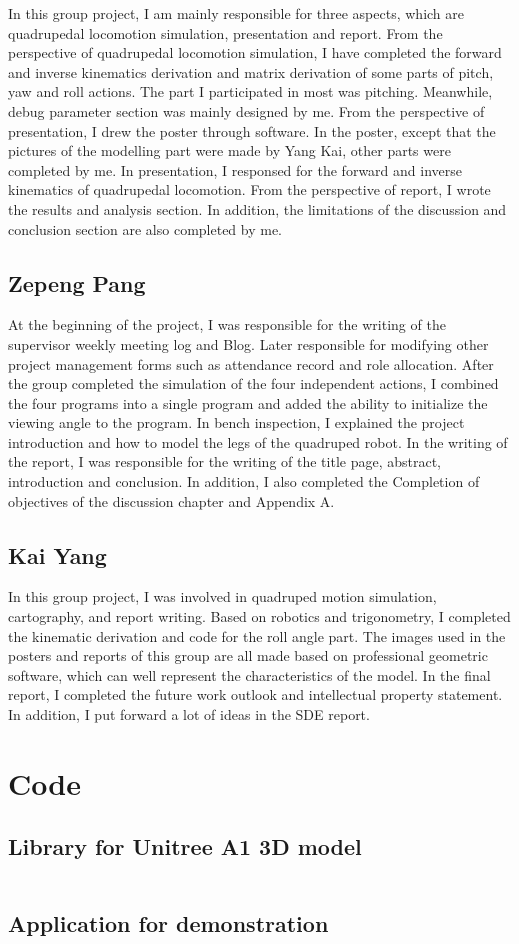 In this group project, I am mainly responsible for three aspects, which are quadrupedal locomotion simulation, presentation and report. From the perspective of quadrupedal locomotion simulation, I have completed the forward and inverse kinematics derivation and matrix derivation of some parts of pitch, yaw and roll actions. The part I participated in most was pitching. Meanwhile, debug parameter section was mainly designed by me. From the perspective of presentation, I drew the poster through software. In the poster, except that the pictures of the modelling part were made by Yang Kai, other parts were completed by me. In presentation, I responsed for the forward and inverse kinematics of quadrupedal locomotion. From the perspective of report, I wrote the results and analysis section. In addition, the limitations of the discussion and conclusion section are also completed by me.

\section{Zepeng Pang}

At the beginning of the project, I was responsible for the writing of the supervisor weekly meeting log and Blog. Later responsible for modifying other project management forms such as attendance record and role allocation. After the group completed the simulation of the four independent actions, I combined the four programs into a single program and added the ability to initialize the viewing angle to the program. In bench inspection, I explained the project introduction and how to model the legs of the quadruped robot. In the writing of the report, I was responsible for the writing of the title page, abstract, introduction and conclusion. In addition, I also completed the Completion of objectives of the discussion chapter and Appendix A.

\section{Kai Yang}

In this group project, I was involved in quadruped motion simulation, cartography, and report writing. Based on robotics and trigonometry, I completed the kinematic derivation and code for the roll angle part. The images used in the posters and reports of this group are all made based on professional geometric software, which can well represent the characteristics of the model. In the final report, I completed the future work outlook and intellectual property statement. In addition, I put forward a lot of ideas in the SDE report.


\chapter{Code}

\section{Library for Unitree A1 3D model}
\inputminted[fontsize=\tiny, breaklines]{python}{../simulation/liba1.py}

\section{Application for demonstration}
\inputminted[fontsize=\tiny, breaklines]{python}{../simulation/pose_control.py}

